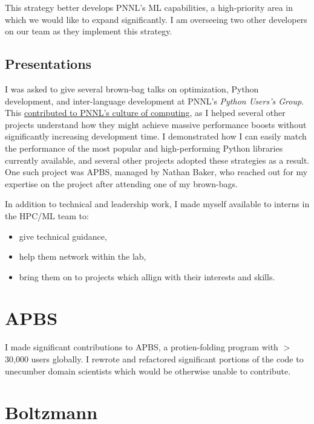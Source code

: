 \documentclass{article}
\begin{document}
This strategy better develops PNNL's ML capabilities, a high-priority area in which we would like to expand significantly.
I am overseeing two other developers on our team as they implement this strategy.

\subsection{Presentations}

I was asked to give several brown-bag talks on optimization, Python development, and inter-language development at PNNL's \textit{Python Users's Group}.
This \underline{contributed to PNNL's culture of computing}, as I helped several other projects understand how they might achieve massive performance boosts without significantly increasing development time.
I demonstrated how I can easily match the performance of the most popular and high-performing Python libraries currently available, and several other projects adopted these strategies as a result.
One such project was APBS, managed by Nathan Baker, who reached out for my expertise on the project after attending one of my brown-bags.

\bigskip

In addition to technical and leadership work, I made myself available to interns in the HPC/ML team to:

\begin{itemize}
  \item give technical guidance,
  \item help them network within the lab,
  \item bring them on to projects which allign with their interests and skills.
\end{itemize}

\section{APBS}

I made significant contributions to APBS, a protien-folding program with $>$30,000 users globally.
I rewrote and refactored significant portions of the code to unecumber domain scientists which would be otherwise unable to contribute.

\section{Boltzmann}
\end{document}
